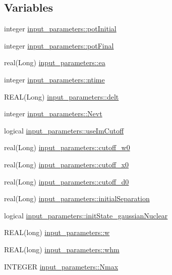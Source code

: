 \subsection*{Variables}
\begin{DoxyCompactItemize}
\item 
integer \hyperlink{namespaceinput__parameters_a27dbda031851f558814121445cf46ed9}{input\_\-parameters::potInitial}
\item 
integer \hyperlink{namespaceinput__parameters_a2ccc9d711d290b3e33fbc675ed390af2}{input\_\-parameters::potFinal}
\item 
real(Long) \hyperlink{namespaceinput__parameters_ac937498371c0568d2d4ed1e1ef034e1d}{input\_\-parameters::ea}
\item 
integer \hyperlink{namespaceinput__parameters_a0c5bab2cbe910c8543c442cb9be582d0}{input\_\-parameters::ntime}
\item 
REAL(Long) \hyperlink{namespaceinput__parameters_a42efff37bd453975f48e8485e5757acd}{input\_\-parameters::delt}
\item 
integer \hyperlink{namespaceinput__parameters_a3db2ebb8fcd24f403d0c3bd05a38e4c2}{input\_\-parameters::Nevt}
\item 
logical \hyperlink{namespaceinput__parameters_aa73f50863135132e72d9a9c93d2cadef}{input\_\-parameters::useImCutoff}
\item 
real(Long) \hyperlink{namespaceinput__parameters_a3987174aef89a10227220b4e5bdecde6}{input\_\-parameters::cutoff\_\-w0}
\item 
real(Long) \hyperlink{namespaceinput__parameters_a87f2d307b48a20f985ea0692b9dfebf6}{input\_\-parameters::cutoff\_\-x0}
\item 
real(Long) \hyperlink{namespaceinput__parameters_a8e63bceb853ebd1124eda12568a0e57f}{input\_\-parameters::cutoff\_\-d0}
\item 
real(Long) \hyperlink{namespaceinput__parameters_a1d8bbaa8b473b798cb43170831cc57ac}{input\_\-parameters::initialSeparation}
\item 
logical \hyperlink{namespaceinput__parameters_add8bfc502078fcdca67fff41e00114f7}{input\_\-parameters::initState\_\-gaussianNuclear}
\item 
REAL(long) \hyperlink{namespaceinput__parameters_a745c6398e72faacdaacba0cf01027565}{input\_\-parameters::w}
\item 
REAL(long) \hyperlink{namespaceinput__parameters_ae3a25357531dd0d2b8c5c4cc2de073d9}{input\_\-parameters::whm}
\item 
INTEGER \hyperlink{namespaceinput__parameters_a29545f09a06c5a3def5df7fdb5f966ab}{input\_\-parameters::Nmax}

\end{DoxyCompactItemize}
